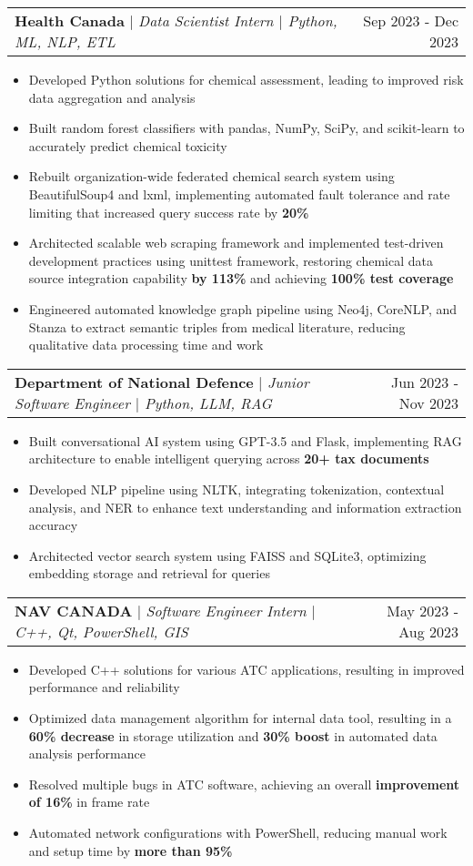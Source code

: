 \documentclass[letterpaper,10pt]{article}
\makeatletter
\newcommand{\resumeItem}[1]{
  \item\small{
    {#1 \vspace{-3pt}}
  }
}
\newcommand{\resumeSubheading}[3]{
    \item
    \begin{tabular*}{0.97\textwidth}[t]{l@{\extracolsep{\fill}}r}
      \textbf{#1} $|$ \textit{ #2} & #3 \\
    \end{tabular*}\vspace{-6pt}
}
\newcommand{\resumeItemListStart}{\begin{itemize}}
\newcommand{\resumeItemListEnd}{\end{itemize}\vspace{-5pt}}
\makeatother
\begin{document}
    \resumeSubheading{Health Canada}{Data Scientist Intern $|$ Python, ML, NLP, ETL}{Sep 2023 - Dec 2023}
      \resumeItemListStart
        \resumeItem{Developed Python solutions for chemical assessment, leading to improved risk data aggregation and analysis}
        \resumeItem{Built random forest classifiers with pandas, NumPy, SciPy, and scikit-learn to accurately predict chemical toxicity}
        \resumeItem{Rebuilt organization-wide federated chemical search system using BeautifulSoup4 and lxml, implementing automated fault tolerance and rate limiting that increased query success rate by \textbf{20\%}}
        \resumeItem{Architected scalable web scraping framework and implemented test-driven development practices using unittest framework, restoring chemical data source integration capability \textbf{by 113\%} and achieving \textbf{100\% test coverage}}
        \resumeItem{Engineered automated knowledge graph pipeline using Neo4j, CoreNLP, and Stanza to extract semantic triples from medical literature, reducing qualitative data processing time and work}
      \resumeItemListEnd

    \resumeSubheading{Department of National Defence}{Junior Software Engineer $|$ Python, LLM, RAG}{Jun 2023 - Nov 2023}
      \resumeItemListStart
        \resumeItem{Built conversational AI system using GPT-3.5 and Flask, implementing RAG architecture to enable intelligent querying across \textbf{20+ tax documents}}
        \resumeItem{Developed NLP pipeline using NLTK, integrating tokenization, contextual analysis, and NER to enhance text understanding and information extraction accuracy}
        \resumeItem{Architected vector search system using FAISS and SQLite3, optimizing embedding storage and retrieval for queries}
      \resumeItemListEnd

    \resumeSubheading{NAV CANADA}{Software Engineer Intern $|$ C++, Qt, PowerShell, GIS}{May 2023 - Aug 2023}
      \resumeItemListStart
        \resumeItem{Developed C++ solutions for various ATC applications, resulting in improved performance and reliability}
        \resumeItem{Optimized data management algorithm for internal data tool, resulting in a \textbf{60\% decrease} in storage utilization and \textbf{30\% boost} in automated data analysis performance}
        \resumeItem{Resolved multiple bugs in ATC software, achieving an overall \textbf{improvement of 16\% } in frame rate}
        \resumeItem{Automated network configurations with PowerShell, reducing manual work and setup time by \textbf{more than 95\%}}
      \resumeItemListEnd
\end{document}
